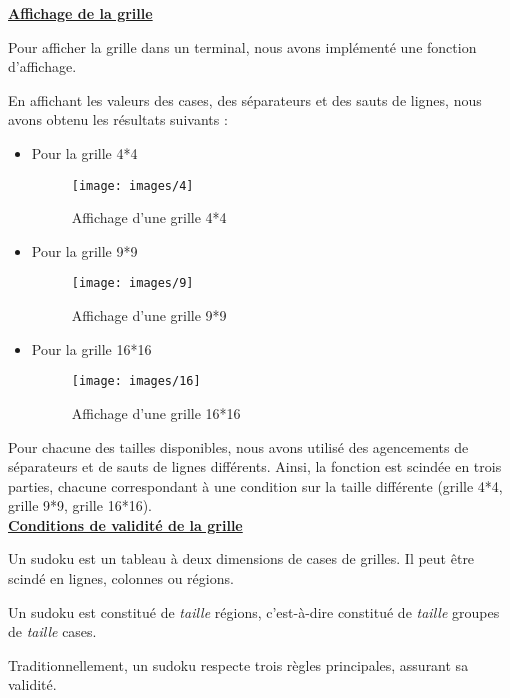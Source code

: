 \documentclass[a4paper, 12pt]{article}
\begin{document}
\underline{\textbf{Affichage de la grille}}

	\par Pour afficher la grille dans un terminal, nous avons implémenté une fonction d'affichage.
	\par En affichant les valeurs des cases, des séparateurs et des sauts de lignes, nous avons obtenu les résultats suivants :
	\begin{itemize}
		\item Pour la grille 4*4

			\begin{figure}[H]
				\caption{Affichage d'une grille 4*4}
				\centering
				\texttt{[image: images/4]}
			\end{figure}

		\item Pour la grille 9*9

			\begin{figure}[H]
				\caption{Affichage d'une grille 9*9}
				\centering
				\texttt{[image: images/9]}
			\end{figure}

		\item Pour la grille 16*16

			\begin{figure}[H]
				\caption{Affichage d'une grille 16*16}
				\centering
				\texttt{[image: images/16]}
			\end{figure}

	\end{itemize} 

	\par Pour chacune des tailles disponibles, nous avons utilisé des agencements de séparateurs et de sauts de lignes différents. Ainsi, la fonction est scindée en trois parties, chacune correspondant à une condition sur la taille différente (grille 4*4, grille 9*9, grille 16*16).\\

\underline{\textbf{Conditions de validité de la grille}}

	\par Un sudoku est un tableau à deux dimensions de cases de grilles. Il peut être scindé en lignes, colonnes ou régions.
	\par Un sudoku est constitué de \textit{taille} régions, c'est-à-dire constitué de \textit{taille} groupes de \textit{taille} cases.
	\par Traditionnellement, un sudoku respecte trois règles principales, assurant sa validité.\\
\end{document}

